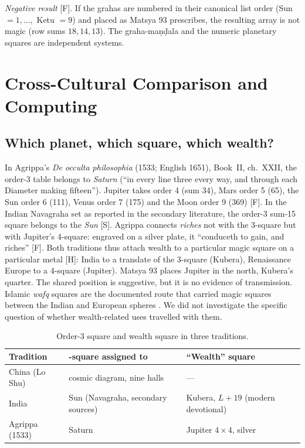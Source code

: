\documentclass[pdflatex,sn-basic]{sn-jnl}
\theoremstyle{thmstyleone}
\theoremstyle{thmstylethree}
\newcommand{\Fact}{\textsf{[F]}}
\newcommand{\Schol}{\textsf{[S]}}
\newcommand{\Hyp}{\textsf{[H]}}
\begin{document}
\emph{Negative result} \Fact. If the grahas are numbered in their canonical list order (Sun $=1,\dots,$ Ketu $=9$) and placed as Matsya 93 prescribes, the resulting array is not magic (row sums $18,14,13$). The graha-ma\d n\d dala and the numeric planetary squares are independent systems.

\section{Cross-Cultural Comparison and Computing}
\label{sec:cross}
\subsection{Which planet, which square, which wealth?}
In Agrippa's \emph{De occulta philosophia} (1533; English 1651), Book~II, ch.~XXII, the order-3 table belongs to \emph{Saturn} (``in every line three every way, and through each Diameter making fifteen''). Jupiter takes order 4 (sum 34), Mars order 5 (65), the Sun order 6 (111), Venus order 7 (175) and the Moon order 9 (369) \citep{agrippa1651} \Fact. In the Indian Navagraha set as reported in the secondary literature, the order-3 sum-15 square belongs to the \emph{Sun} \citep{datta1992} \Schol. Agrippa connects \emph{riches} not with the 3-square but with Jupiter's 4-square: engraved on a silver plate, it ``conduceth to gain, and riches'' \citep{agrippa1651} \Fact. Both traditions thus attach wealth to a particular magic square on a particular metal \Hyp: India to a translate of the 3-square (Kubera), Renaissance Europe to a 4-square (Jupiter). Matsya 93 places Jupiter in the north, Kubera's quarter. The shared position is suggestive, but it is no evidence of transmission. Islamic \emph{wafq} squares are the documented route that carried magic squares between the Indian and European spheres \citep{cammann1969a,cammann1969b}. We did not investigate the specific question of whether wealth-related uses travelled with them.

\begin{table}[t]
\caption{Order-3 square and wealth square in three traditions.}
\label{tab:cross}
\centering\small
\setlength{\tabcolsep}{3pt}
\begin{tabular}{@{}>{\raggedright\arraybackslash}p{}>{\raggedright\arraybackslash}p{}>{\raggedright\arraybackslash}p{}@{}}
\toprule
Tradition & 3-square assigned to & ``Wealth'' square\\
\midrule
China (Lo Shu) & cosmic diagram, nine halls \citep{cammann1961} & ---\\
India & Sun (Navagraha, secondary sources) & Kubera, $L+19$ (modern devotional)\\
Agrippa (1533) & Saturn \citep{agrippa1651} & Jupiter $4\times4$, silver \citep{agrippa1651}\\
\bottomrule
\end{tabular}
\end{table}
\end{document}
